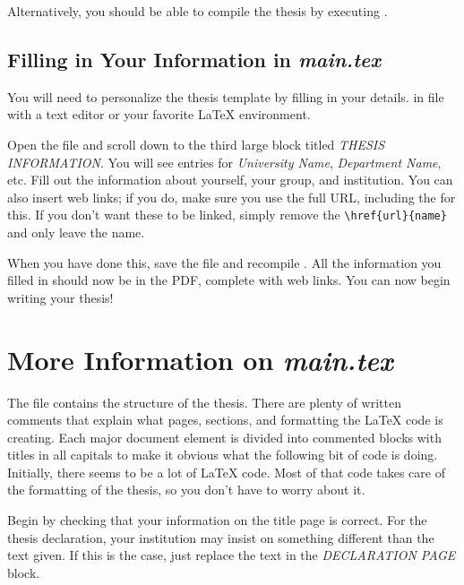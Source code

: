 Alternatively, you should be able to compile the thesis by executing .

\subsection{Filling in Your Information in \emph{main.tex}}\label{FillingFile}

You will need to personalize the thesis template by filling in your details. in   file with a text editor or your favorite LaTeX environment.

Open the file and scroll down to the third large block titled \emph{THESIS INFORMATION}. You will see entries for \emph{University Name}, \emph{Department Name}, etc. Fill out the information about yourself, your group, and institution.%
You can also insert web links; if you do, make sure you use the full URL, including the  for this. If you don't want these to be linked, simply remove the \verb|\href{url}{name}| and only leave the name.

When you have done this, save the file and recompile . All the information you filled in should now be in the PDF, complete with web links. You can now begin writing your thesis!


\section{More Information on \emph{main.tex}}

The  file contains the structure of the thesis. There are plenty of written comments that explain what pages, sections, and formatting the LaTeX code is creating. Each major document element is divided into commented blocks with titles in all capitals to make it obvious what the following bit of code is doing. Initially, there seems to be a lot of LaTeX code. Most of that code takes care of the formatting of the thesis, so you don't have to worry about it.

Begin%
 by checking that your information on the title page is correct. For the thesis declaration, your institution may insist on something different than the text given. If this is the case, just replace the text in the \emph{DECLARATION PAGE} block.

